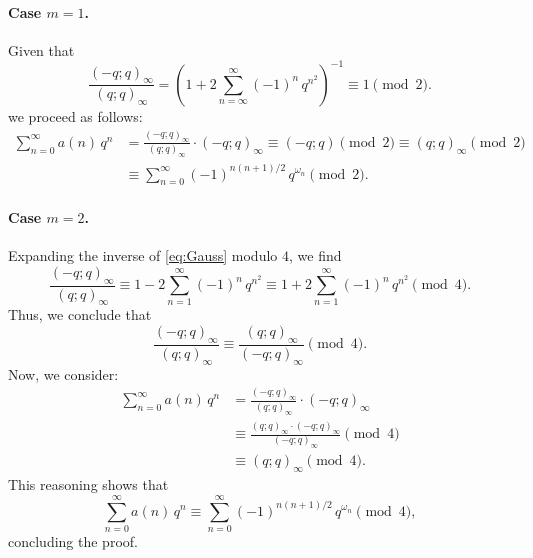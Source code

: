 \documentclass{article}
\begin{document}
    \paragraph{Case $m=1$.}  Given that 
    $$
    \frac{(-q;q)_\infty}{(q;q)_\infty} = \left( 1+2 \sum_{n=\infty}^\infty (-1)^n\,q^{n^2} \right)^{-1}  \equiv 1 \pmod 2.
    $$
    we proceed as follows:
    \begin{align*}
        \sum_{n=0}^\infty a(n)\,q^n &= \frac{(-q;q)_\infty}{(q;q)_\infty}\cdot (-q;q)_\infty 
         \equiv (-q;q) \pmod 2
         \equiv  (q;q)_\infty \pmod 2 \\
        & \equiv \sum_{n=0}^\infty (-1)^{n(n+1)/2}\,q^{\omega_n} \pmod 2.
    \end{align*}


     \paragraph{Case $m=2$.} Expanding the inverse of \eqref{eq:Gauss} modulo $4$, we find
$$
\frac{(-q;q)_\infty}{(q;q)_\infty} \equiv 1 - 2 \sum_{n=1}^\infty (-1)^n\, q^{n^2} \equiv 1 + 2 \sum_{n=1}^\infty (-1)^n\, q^{n^2} \pmod{4}.
$$
Thus, we conclude that
$$
\frac{(-q;q)_\infty}{(q;q)_\infty} \equiv \frac{(q;q)_\infty}{(-q;q)_\infty} \pmod{4}.
$$
Now, we consider:
\begin{align*}
    \sum_{n=0}^\infty a(n)\,q^n &= \frac{(-q;q)_\infty}{(q;q)_\infty} \cdot (-q;q)_\infty \\
    &\equiv \frac{(q;q)_\infty \cdot (-q;q)_\infty}{(-q;q)_\infty} \pmod{4} \\
    &\equiv (q;q)_\infty \pmod{4}.
\end{align*}
This reasoning shows that
$$\sum_{n=0}^\infty a(n)\, q^n \equiv \sum_{n=0}^\infty (-1)^{n(n+1)/2}\,q^{\omega_n}  \pmod{4},$$ 
concluding the proof.
\end{document}
